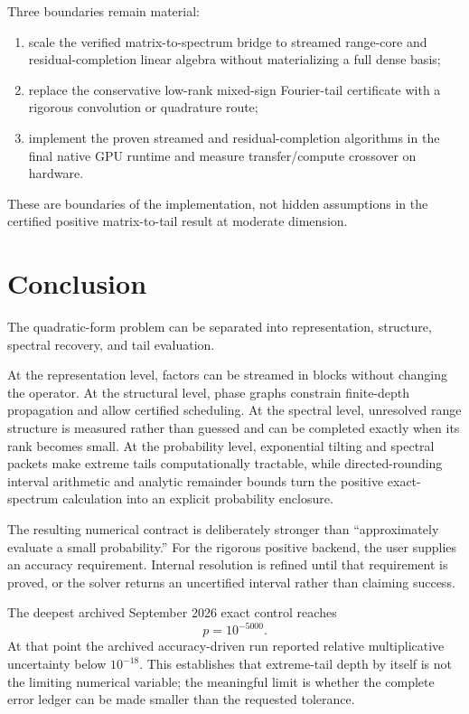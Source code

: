 \documentclass[11pt]{article}
\theoremstyle{definition}
\theoremstyle{remark}
\begin{document}
Three boundaries remain material:

\begin{enumerate}
\item scale the verified matrix-to-spectrum bridge to streamed range-core and
residual-completion linear algebra without materializing a full dense basis;
\item replace the conservative low-rank mixed-sign Fourier-tail certificate
with a rigorous convolution or quadrature route;
\item implement the proven streamed and residual-completion algorithms in the
final native GPU runtime and measure transfer/compute crossover on hardware.
\end{enumerate}

These are boundaries of the implementation, not hidden assumptions in the
certified positive matrix-to-tail result at moderate dimension.


\section{Conclusion}\label{sec:final-32}

The quadratic-form problem can be separated into representation, structure,
spectral recovery, and tail evaluation.

At the representation level, factors can be streamed in blocks without
changing the operator.  At the structural level, phase graphs constrain
finite-depth propagation and allow certified scheduling.  At the spectral
level, unresolved range structure is measured rather than guessed and can be
completed exactly when its rank becomes small.  At the probability level,
exponential tilting and spectral packets make extreme tails computationally
tractable, while directed-rounding interval arithmetic and analytic remainder
bounds turn the positive exact-spectrum calculation into an explicit
probability enclosure.

The resulting numerical contract is deliberately stronger than
``approximately evaluate a small probability.''  For the rigorous positive
backend, the user supplies an accuracy requirement.  Internal resolution is
refined until that requirement is proved, or the solver returns an
uncertified interval rather than claiming success.

The deepest archived September 2026 exact control reaches
\[
p=10^{-5000}.
\]
At that point the archived accuracy-driven run reported relative multiplicative
uncertainty below \(10^{-18}\).  This establishes that extreme-tail depth by
itself is not the limiting numerical variable; the meaningful limit is whether
the complete error ledger can be made smaller than the requested tolerance.
\end{document}
